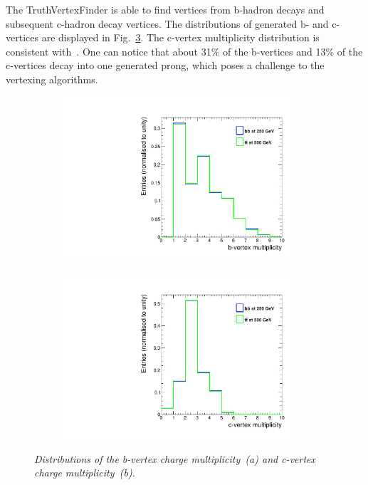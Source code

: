 The TruthVertexFinder is able to find vertices from b-hadron decays and subsequent c-hadron decay vertices. The distributions of generated b- and c-vertices are displayed in Fig.~\ref{fig:GenVtx_3}. The c-vertex multiplicity distribution is consistent with~\cite{bib:PDG}. One can notice that about 31\% of the b-vertices and 13\% of the c-vertices decay into one generated prong, which poses a challenge to the vertexing algorithms. 

\begin{figure}[h]
\centering
\begin{subfigure}{0.5\textwidth}
    \includegraphics[width=0.95\textwidth]{ILD/plots/gen-b-vtx.pdf}
\caption{\label{fig:GenVtx_a_3} }
\end{subfigure}%
  \begin{subfigure}{0.5\textwidth}
\centering
    \includegraphics[width=0.95\textwidth]{ILD/plots/gen-c-vtx.pdf}
\caption{\label{fig:GenVtx_b_3} }
\end{subfigure}
    \caption{\sl Distributions of the b-vertex charge multiplicity~(a) and c-vertex charge multiplicity~(b). }
    \label{fig:GenVtx_3}
\end{figure}

